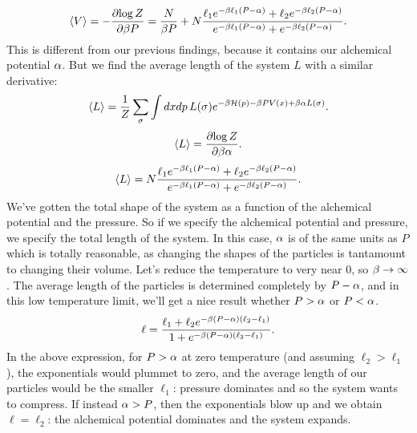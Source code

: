 \documentclass[12pt]{article}
\begin{document}
\[ \left \langle V \right \rangle = -\frac{\partial {\log Z}}{\partial {\beta P}} = \frac{N}{\beta P} + N \frac{\ell_1e^{-\beta \ell_1 (P - \alpha)} + \ell_2e^{-\beta \ell_2 (P-\alpha)}}{e^{-\beta \ell_1 (P - \alpha)} + e^{-\beta \ell_2 (P-\alpha)}}.\]
This is different from our previous findings, because it contains our alchemical potential $\alpha$. But we find the average length of the system $L$ with a similar derivative:
\[ \left \langle L \right \rangle = \frac{1}{Z} \sum_\sigma \int dx dp \, L(\sigma) e^{-\beta \mathcal{H}(p) - \beta PV(x) + \beta \alpha L(\sigma)}.\]
\[ \left \langle L \right \rangle = \frac{\partial {\log Z}}{\partial {\beta\alpha}}.\]
\[ \left \langle L \right \rangle = N \frac{\ell_1e^{-\beta \ell_1 (P - \alpha)} + \ell_2e^{-\beta \ell_2 (P-\alpha)}}{e^{-\beta \ell_1 (P - \alpha)} + e^{-\beta \ell_2 (P-\alpha)}}.\]
We've gotten the total shape of the system as a function of the alchemical potential and the pressure. So if we specify the alchemical potential and pressure, we specify the total length of the system. In this case, $\alpha$ is of the same units as $P$ which is totally reasonable, as changing the shapes of the particles is tantamount to changing their volume. Let's reduce the temperature to very near 0, so $\beta \rightarrow \infty$. The average length of the particles is determined completely by $P-\alpha$, and in this low temperature limit, we'll get a nice result whether $P>\alpha$ or $P<\alpha$. 
\[ \ell = \frac{\ell_1 + \ell_2 e^{-\beta(P-\alpha)(\ell_2-\ell_1)}}{1+e^{-\beta (P-\alpha)(\ell_2-\ell_1)}}.\]
In the above expression, for $P >\alpha$ at zero temperature (and assuming $\ell_2>\ell_1$), the exponentials would plummet to zero, and the average length of our particles would be the smaller $\ell_1$: pressure dominates and so the system wants to compress. If instead $\alpha> P$, then the exponentials blow up and we obtain $\ell = \ell_2$: the alchemical potential dominates and the system expands.
\end{document}
